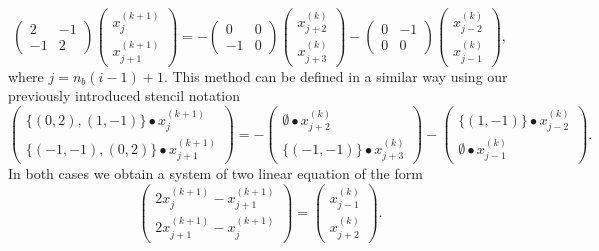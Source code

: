 \begin{equation}
	\begin{pmatrix}
		2 & -1 \\
		-1 & 2
	\end{pmatrix}
	\begin{pmatrix}
		x_{j}^{(k+1)} \\ x_{j+1}^{(k+1)} 
	\end{pmatrix}
= 	-  \begin{pmatrix}
	0 & 0 \\
	-1 & 0
\end{pmatrix} 	
\begin{pmatrix}
x_{j+2}^{(k)} \\ x_{j+3}^{(k)}
\end{pmatrix} -
\begin{pmatrix}
	0 & -1 \\
	0 & 0
\end{pmatrix} 	
\begin{pmatrix}
	x_{j-2}^{(k)} \\ x_{j-1}^{(k)} 
\end{pmatrix},
\end{equation}
where $j = n_b (i - 1) + 1$.
This method can be defined in a similar way using our previously introduced stencil notation
\begin{equation}
	\begin{pmatrix}
		\{(0, 2), (1, -1)\} \bullet x_{j}^{(k+1)} \\ \{(-1, -1), (0, 2)\} \bullet x_{j+1}^{(k+1)} 
	\end{pmatrix}
	= 	-
	\begin{pmatrix}
		\emptyset \bullet x_{j+2}^{(k)} \\ \{(-1, -1)\} \bullet x_{j + 3}^{(k)}
	\end{pmatrix} -
	\begin{pmatrix}
		\{(1,-1)\} \bullet x_{j-2}^{(k)} \\ \emptyset \bullet x_{j-1}^{(k)} 
	\end{pmatrix}.
\end{equation}
In both cases we obtain a system of two linear equation of the form
\begin{equation}
	\begin{pmatrix}
		2 x_{j}^{(k+1)} - x_{j+1}^{(k+1)} \\ 2 x_{j+1}^{(k+1)} - x_{j}^{(k+1)} 
	\end{pmatrix}
	=
	\begin{pmatrix}
		x_{j - 1}^{(k)} \\ x_{j + 2}^{(k)}
	\end{pmatrix}.
\end{equation}
